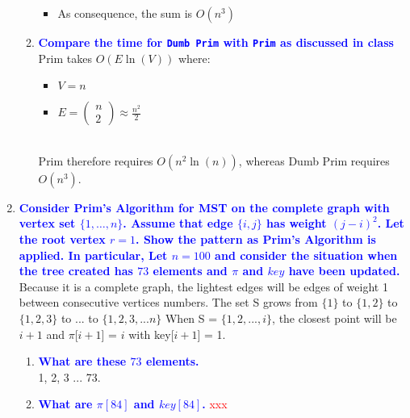 \documentclass[11pt]{article}
\begin{document}
\begin{enumerate}
\begin{enumerate}
\begin{itemize}
            \item As consequence, the sum is $O(n^3)$
        \end{itemize}
    \item \textbf{\textcolor{blue}{Compare the time for {\tt Dumb Prim} with {\tt Prim} as discussed in class}}
        \\ Prim takes $O(E\ln(V))$ where:
        \begin{itemize}
            \item $V = n$
            \item $E = \left(\begin{smallmatrix} n \\ 2 \end{smallmatrix}\right) \approx \frac{n^2}{2}$
        \end{itemize}
        \\ Prim therefore requires $O(n^2\ln(n))$, whereas Dumb Prim requires $O(n^3)$.
\end{enumerate}

\item \textbf{\textcolor{blue}{Consider Prim's Algorithm for MST on the complete graph with vertex set $\{1,\ldots,n\}$.  Assume that edge $\{i,j\}$ has weight $(j-i)^2$.  Let the root vertex $r=1$.  Show the pattern as Prim's Algorithm is applied. In particular, Let $n=100$ and consider the situation when the tree created has $73$ elements and $\pi$ and $key$ have been updated.}}
    \\ Because it is a complete graph, the lightest edges will be edges of weight 1 between consecutive vertices numbers. 
    The set S grows from $\{1\}$ to $\{1,2\}$ to $\{1,2,3\}$ to ... to $\{1,2,3, ... n\}$
    When S = $\{1,2,...,i\}$, the closest point will be $i+1$ and $\pi$[$i+1$] = $i$ with key[$i+1$] = 1.
\begin{enumerate}
    \item \textbf{\textcolor{blue}{What are these $73$ elements.}}
        \\ 1, 2, 3 ... 73.
    \item \textbf{\textcolor{blue}{What are $\pi[84]$ and $key[84]$.}}
        \textcolor{red}{xxx}
    
\end{enumerate}


\end{enumerate}
\end{document}
